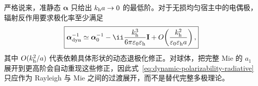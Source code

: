 严格说来，准静态 $\boldsymbol\alpha$ 只给出 $k_{\rm h}a\to0$ 的最低阶。对于无损均匀宿主中的电偶极，辐射反作用要求极化率至少满足
\begin{equation}
 \boxed{
 \boldsymbol\alpha_{\rm dyn}^{-1}
 \simeq\boldsymbol\alpha_0^{-1}
 -\ii\frac{k_{\rm h}^3}{6\pi\varepsilon_0\varepsilon_{\rm h}}\mathbf I
 +O\!\left(\frac{k_{\rm h}^2}{\varepsilon_0\varepsilon_{\rm h}a}\right),}
 \label{eq:dynamic-polarizability-radiative}
\end{equation}
其中 $O(k_{\rm h}^2/a)$ 代表依赖具体形状的动态退极化修正。对球体，把完整 Mie 的 $a_1$ 展开到更高阶会自动重现这些修正，因此式~\eqref{eq:dynamic-polarizability-radiative} 只应作为 Rayleigh 与 Mie 之间的过渡展开，而不是替代完整多极理论。

